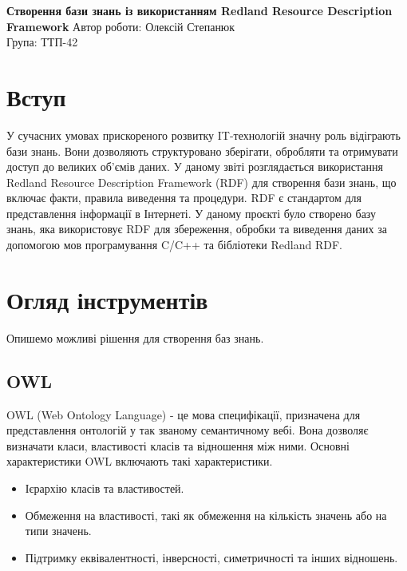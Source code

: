 \documentclass[12pt, a4paper]{article}
\begin{document}
\begin{titlepage}
    \centering
    \vfill
    {\bfseries\Huge
        Створення бази знань із використанням Redland Resource Description Framework
    }
    \vfill
    \vfill
    {\Large
        Автор роботи: Олексій Степанюк \\
        \vspace{1cm}
        Група: ТТП-42 \\
        \vspace{1cm}
    }
    \vfill
\end{titlepage}

\tableofcontents
\newpage

\section{Вступ}

У сучасних умовах прискореного розвитку IT-технологій значну роль відіграють бази знань. Вони дозволяють структуровано зберігати, обробляти та отримувати доступ до великих об'ємів даних. У даному звіті розглядається використання Redland Resource Description Framework (RDF) для створення бази знань, що включає факти, правила виведення та процедури. RDF є стандартом для представлення інформації в Інтернеті. У даному проєкті було створено базу знань, яка використовує RDF для збереження, обробки та виведення даних за допомогою мов програмування C/C++ та бібліотеки Redland RDF.

\section{Огляд інструментів}

Опишемо можливі рішення для створення баз знань.

\subsection{OWL}

OWL (Web Ontology Language) - це мова специфікації, призначена для представлення онтологій у так званому семантичному вебі. Вона дозволяє визначати класи, властивості класів та відношення між ними. Основні характеристики OWL включають такі характеристики.

\begin{itemize}
    \item Ієрархію класів та властивостей.
    \item Обмеження на властивості, такі як обмеження на кількість значень або на типи значень.
    \item Підтримку еквівалентності, інверсності, симетричності та інших відношень.
\end{itemize}
\end{document}

